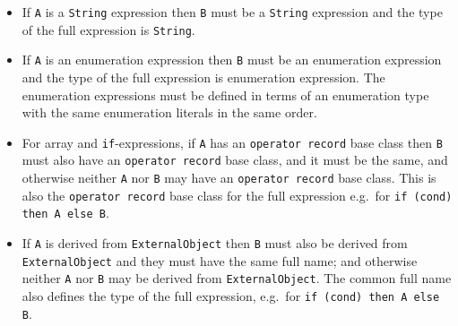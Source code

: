 \begin{itemize}
\item
  If \lstinline!A! is a \lstinline!String! expression then \lstinline!B! must be a \lstinline!String! expression and the type of the full expression  is \lstinline!String!.
\item
  If \lstinline!A! is an enumeration expression then \lstinline!B! must be an enumeration expression and the type of the full expression is enumeration expression.
  The enumeration expressions must be defined in terms of an enumeration type with the same enumeration literals in the same order.
\item
  For array and \lstinline!if!-expressions, if \lstinline!A! has an \lstinline!operator record! base class then \lstinline!B! must also have an \lstinline!operator record! base class, and it must be the same, and otherwise neither \lstinline!A! nor \lstinline!B! may have an \lstinline!operator record! base class.
  This is also the \lstinline!operator record! base class for the full expression e.g.\ for \lstinline!if (cond) then A else B!.
\item
  If \lstinline!A! is derived from \lstinline!ExternalObject! then \lstinline!B! must also be derived from \lstinline!ExternalObject! and they must have the same full name; and otherwise neither \lstinline!A! nor \lstinline!B! may be derived from \lstinline!ExternalObject!.
  The common full name also defines the type of the full expression, e.g.\ for \lstinline!if (cond) then A else B!.
\end{itemize}
